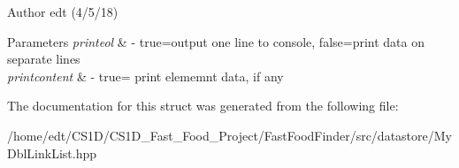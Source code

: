 \begin{DoxyAuthor}{Author}
edt (4/5/18)
\end{DoxyAuthor}

\begin{DoxyParams}{Parameters}
{\em printeol} & -\/ true=output one line to console, false=print data on separate lines \\
\hline
{\em printcontent} & -\/ true= print elememnt data, if any \\
\hline
\end{DoxyParams}


The documentation for this struct was generated from the following file\-:\begin{DoxyCompactItemize}
\item 
/home/edt/\-C\-S1\-D/\-C\-S1\-D\-\_\-\-Fast\-\_\-\-Food\-\_\-\-Project/\-Fast\-Food\-Finder/src/datastore/My\-Dbl\-Link\-List.\-hpp\end{DoxyCompactItemize}

